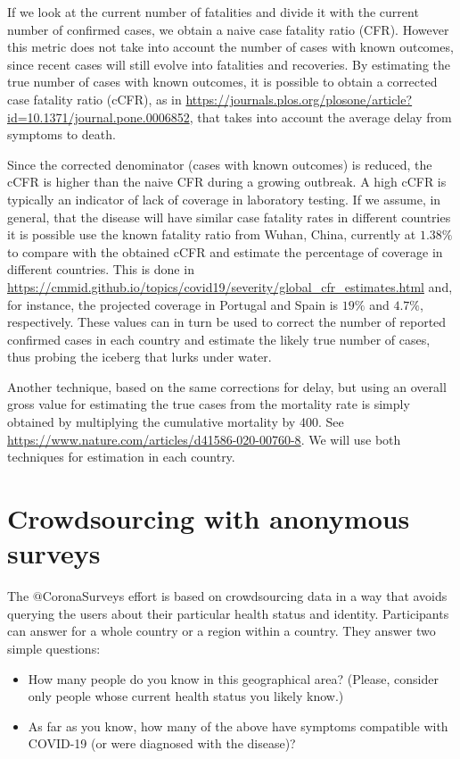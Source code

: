 \documentclass{article}
\begin{document}
If we look at the current number of fatalities and divide it with the current number of confirmed cases, we obtain a naive case fatality ratio (CFR). However this metric does not take into account the number of cases with known outcomes, since recent cases will still evolve into fatalities and recoveries. By estimating the true number of cases with known outcomes, it is possible to obtain a corrected case fatality ratio (cCFR), as in \url{https://journals.plos.org/plosone/article?id=10.1371/journal.pone.0006852}, that takes into account the average delay from symptoms to death.  

Since the corrected denominator (cases with known outcomes) is reduced, the cCFR is higher than the naive CFR during a growing outbreak. A high cCFR is typically an indicator of lack of coverage in laboratory testing. If we assume, in general, that the disease will have similar case fatality rates in different countries it is possible use the known fatality ratio from Wuhan, China, currently at $1.38\%$
to compare with the obtained cCFR and estimate the percentage of coverage in different countries. This is done in \url{https://cmmid.github.io/topics/covid19/severity/global_cfr_estimates.html} and, for instance, the projected coverage in Portugal and Spain is $19\%$ and $4.7\%$, respectively. These values can in turn be used to correct the number of reported confirmed cases in each country and estimate the likely true number of cases, thus probing the iceberg that lurks under water.

Another technique, based on the same corrections for delay, but using an overall gross value for estimating the true cases from the mortality rate is simply obtained by multiplying the cumulative mortality by 400. See \url{https://www.nature.com/articles/d41586-020-00760-8}. We will use both techniques for estimation in each country.

\section{Crowdsourcing with anonymous surveys}

The $@$CoronaSurveys effort is based on crowdsourcing data in a way that avoids querying the users about their particular health status and identity. Participants can answer for a whole country or a region within a country. They answer two simple questions: 

\begin{itemize}
\item How many people do you know in this geographical area? (Please, consider only people whose current health status you likely know.)
\item As far as you know, how many of the above have symptoms compatible with COVID-19 (or were diagnosed with the disease)?
\end{itemize}
\end{document}
